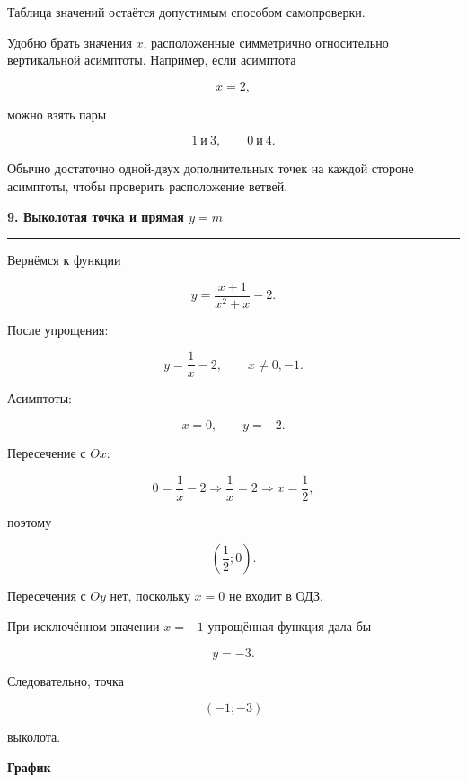 \documentclass[a4paper,12pt]{article}
\newcommand{\sectiontitle}[1]{%
    \par\vspace{0.65em}
    {\Large\bfseries\color{darkaccent}#1}\par
    \vspace{0.15em}
    {\color{accent}\rule{\linewidth}{0.65pt}}\par
    \vspace{0.3em}
}
\newcommand{\subsectiontitle}[1]{%
    \par\vspace{0.45em}
    {\large\bfseries\color{darkaccent}#1}\par
    \vspace{0.1em}
}
\begin{document}
Таблица значений остаётся допустимым способом самопроверки.

Удобно брать значения \(x\), расположенные симметрично относительно
вертикальной асимптоты. Например, если асимптота

\[
x=2,
\]

можно взять пары

\[
1\ \text{и}\ 3,
\qquad
0\ \text{и}\ 4.
\]

Обычно достаточно одной-двух дополнительных точек на каждой стороне
асимптоты, чтобы проверить расположение ветвей.

\sectiontitle{9. Выколотая точка и прямая \(y=m\)}

Вернёмся к функции

\[
y=\frac{x+1}{x^2+x}-2.
\]

После упрощения:

\[
y=\frac1x-2,
\qquad
\boxed{x\ne0,-1}.
\]

Асимптоты:

\[
\boxed{x=0},
\qquad
\boxed{y=-2}.
\]

Пересечение с \(Ox\):

\[
0=\frac1x-2
\Longrightarrow
\frac1x=2
\Longrightarrow
x=\frac12,
\]

поэтому

\[
\boxed{\left(\frac12;0\right)}.
\]

Пересечения с \(Oy\) нет, поскольку \(x=0\) не входит в ОДЗ.

При исключённом значении \(x=-1\) упрощённая функция дала бы

\[
y=-3.
\]

Следовательно, точка

\[
\boxed{(-1;-3)}
\]

выколота.

\subsectiontitle{График}
\end{document}
